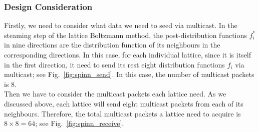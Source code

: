 \subsubsection{Design Consideration}
Firstly, we need to consider what data we need to seed via multicast. In the steaming step of the lattice Boltzmann method, the post-distribution functions $f_i^*$ in nine directions are the distribution function of its neighbours in the corresponding directions. In this case, for each individual lattice, since it is itself in the first direction, it need to send its rest eight distribution functions $f_i$ via multicast; see Fig.~\ref{fig:spinn_send}. In this case, the number of multicast packets is 8.\\

Then we have to consider the multicast packets each lattice need. As we discussed above, each lattice will send eight multicast packets from each of its neighbours. Therefore, the total multicast packets a lattice need to acquire is $8 \times 8 = 64$; see Fig.~\ref{fig:spinn_receive}.\\

